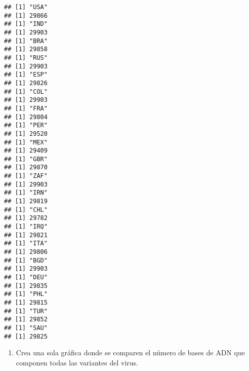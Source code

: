 \documentclass[
]{article}
\providecommand{\tightlist}{%
  \setlength{\itemsep}{0pt}\setlength{\parskip}{0pt}}
\begin{document}
\begin{verbatim}
## [1] "USA"
## [1] 29866
## [1] "IND"
## [1] 29903
## [1] "BRA"
## [1] 29858
## [1] "RUS"
## [1] 29903
## [1] "ESP"
## [1] 29826
## [1] "COL"
## [1] 29903
## [1] "FRA"
## [1] 29804
## [1] "PER"
## [1] 29520
## [1] "MEX"
## [1] 29409
## [1] "GBR"
## [1] 29870
## [1] "ZAF"
## [1] 29903
## [1] "IRN"
## [1] 29819
## [1] "CHL"
## [1] 29782
## [1] "IRQ"
## [1] 29821
## [1] "ITA"
## [1] 29806
## [1] "BGD"
## [1] 29903
## [1] "DEU"
## [1] 29835
## [1] "PHL"
## [1] 29815
## [1] "TUR"
## [1] 29852
## [1] "SAU"
## [1] 29825
\end{verbatim}

\begin{enumerate}
\def\labelenumi{\arabic{enumi}.}
\setcounter{enumi}{2}
\tightlist
\item
  Crea una sola gráfica donde se comparen el número de bases de ADN que
  componen todas las variantes del virus.
\end{enumerate}
\end{document}
